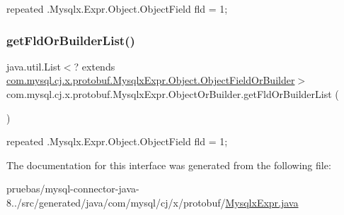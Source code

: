 {\ttfamily repeated .Mysqlx.\+Expr.\+Object.\+Object\+Field fld = 1;} \mbox{\label{interfacecom_1_1mysql_1_1cj_1_1x_1_1protobuf_1_1_mysqlx_expr_1_1_object_or_builder_ac816a83c0f742ab953fe7afb8534b20e}} 
\subsubsection{\texorpdfstring{get\+Fld\+Or\+Builder\+List()}{getFldOrBuilderList()}}
{\footnotesize\ttfamily java.\+util.\+List$<$? extends \mbox{\hyperlink{interfacecom_1_1mysql_1_1cj_1_1x_1_1protobuf_1_1_mysqlx_expr_1_1_object_1_1_object_field_or_builder}{com.\+mysql.\+cj.\+x.\+protobuf.\+Mysqlx\+Expr.\+Object.\+Object\+Field\+Or\+Builder}}$>$ com.\+mysql.\+cj.\+x.\+protobuf.\+Mysqlx\+Expr.\+Object\+Or\+Builder.\+get\+Fld\+Or\+Builder\+List (\begin{DoxyParamCaption}{ }\end{DoxyParamCaption})}

{\ttfamily repeated .Mysqlx.\+Expr.\+Object.\+Object\+Field fld = 1;} 

The documentation for this interface was generated from the following file\+:\begin{DoxyCompactItemize}
\item 
pruebas/mysql-\/connector-\/java-\/8../src/generated/java/com/mysql/cj/x/protobuf/\mbox{\hyperlink{_mysqlx_expr_8java}{Mysqlx\+Expr.\+java}}\end{DoxyCompactItemize}
